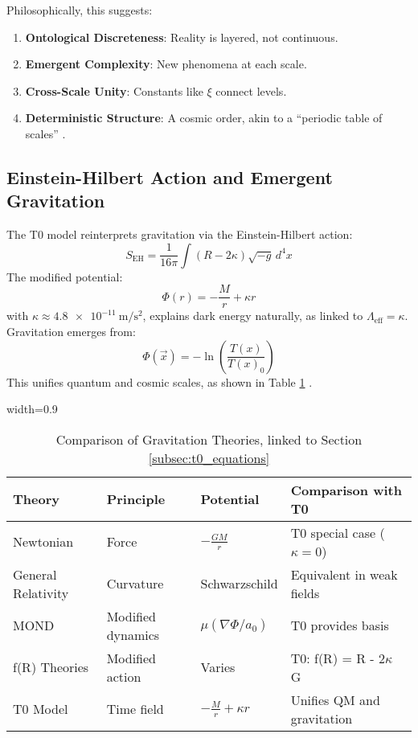 \documentclass[12pt,a4paper]{article}
\newcommand{\Tfield}{T(x)}
\newcommand{\tablescale}{0.9}
\begin{document}
	Philosophically, this suggests:
	\begin{enumerate}
		\item \textbf{Ontological Discreteness}: Reality is layered, not continuous.
		\item \textbf{Emergent Complexity}: New phenomena at each scale.
		\item \textbf{Cross-Scale Unity}: Constants like \(\xi\) connect levels.
		\item \textbf{Deterministic Structure}: A cosmic order, akin to a “periodic table of scales” \cite{pascher_perspective_2025}.
	\end{enumerate}
	
	\subsection{Einstein-Hilbert Action and Emergent Gravitation}
	\label{sec:gravitation}
	
	The T0 model reinterprets gravitation via the Einstein-Hilbert action:
	\[
	S_{\text{EH}} = \frac{1}{16 \pi} \int (R - 2 \kappa) \sqrt{-g} \, d^4x
	\]
	The modified potential:
	\[
	\Phi(r) = -\frac{M}{r} + \kappa r
	\]
	with \(\kappa \approx \SI{4.8e-11}{\meter\per\second\squared}\), explains dark energy naturally, as linked to \(\Lambda_{\text{eff}} = \kappa\). Gravitation emerges from:
	\[
	\Phi(\vec{x}) = -\ln\left(\frac{\Tfield}{\Tfield_0}\right)
	\]
	This unifies quantum and cosmic scales, as shown in Table \ref{tab:theory_comparison} \cite{pascher_emergente_2025}.
	
	\begin{table}[htbp]
		\centering
		\begin{adjustbox}{width=\tablescale\textwidth}
			\begin{tabular}{p{3cm}p{3cm}p{4cm}p{4cm}}
				\toprule
				\textbf{Theory} & \textbf{Principle} & \textbf{Potential} & \textbf{Comparison with T0} \\
				\midrule
				Newtonian & Force & \(-\frac{G M}{r}\) & T0 special case (\(\kappa = 0\)) \\
				General Relativity & Curvature & Schwarzschild & Equivalent in weak fields \\
				MOND & Modified dynamics & \(\mu(\nabla \Phi/a_0)\) & T0 provides basis \\
				f(R) Theories & Modified action & Varies & T0: f(R) = R - 2\(\kappa\) G \\
				T0 Model & Time field & \(-\frac{M}{r} + \kappa r\) & Unifies QM and gravitation \\
				\bottomrule
			\end{tabular}
		\end{adjustbox}
		\caption{Comparison of Gravitation Theories, linked to Section \ref{subsec:t0_equations}}
		\label{tab:theory_comparison}
	\end{table}
\end{document}
